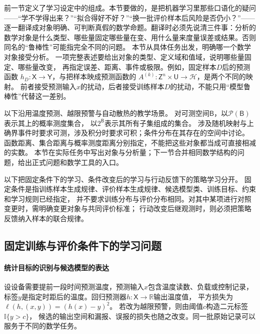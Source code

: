 前一节定义了学习设定中的组成。本节要做的，是把机器学习里那些口语化的疑问——“学不学得出来？”“拟合得好不好？”“换一批评价样本后风险是否仍小？”——逐一翻译成对象明确、可判断真假的数学命题。翻译时必须先说清三件事：分析的数学对象是什么类型、哪些量固定哪些量在变、用什么量来度量误差或结果。否则同名的“鲁棒性”可能指完全不同的问题。
本节从具体任务出发，明确哪一个数学对象接受分析。
一项完整表述要给出对象的类型、定义域和值域，说明哪些量固定、哪些量改变，
再指定误差、距离、事件或极限。例如，固定样本$D$后的预测函数
$h_D:\mathsf X\to\mathsf Y$，与把样本映成预测函数的
$A^{(k)}:\mathsf Z^n\times\mathsf U\to\mathcal H$，是两个不同的映射。
前者接受预测输入$x$的扰动，后者接受训练样本$D$的扰动，不能只用“模型鲁棒性”代替这一差别。

以下沿用温度预测、越限预警与自动散热的教学场景。
对可测空间$\mathsf B$，以$\mathcal P(\mathsf B)$表示其上的概率测度集合，
以$2^{\mathsf B}$表示其所有子集组成的集合。
涉及随机映射与上确界事件时要求可测，涉及积分时要求可积；条件分布在其存在的空间中讨论。
函数距离、集合距离与概率测度距离分别指定，不能把这些对象都当成可直接相减的实数。
本节在实际任务中写出对象与分析量；下一节合并相同数学结构的问题，给出正式问题和数学工具的入口。

以下把固定条件下的学习、条件改变后的学习与行动反馈下的策略学习分开。
固定条件是指训练样本生成规律、评价样本生成规律、候选模型类、训练目标、约束和学习规则已经指定，
并不要求训练分布与评价分布相同。对其中某项进行对照变更时，需明确变更对象与共同评价标准；
行动改变后继观测时，则必须把策略反馈纳入样本的联合规律。

\subsection{固定训练与评价条件下的学习问题}
\label{sec:future-fixed-learning-conditions}

\paragraph{统计目标的识别与候选模型的表达}
\label{sec:future-ml-information-expression}

设设备需要提前一段时间预测温度，预测输入$x$包含温度读数、负载或控制记录，
标签$y$是指定时距后的温度。回归预测器$h:\mathsf X\to\mathbb R$输出温度值，
平方损失为$\ell(h,(x,y))=(h(x)-y)^2$。
若改为越限预警，则由阈值$c$构造二元标签$\mathbb I\{y>c\}$，
候选的输出空间和漏报、误报的损失也随之改变。同一批原始记录可以服务于不同的数学任务。

